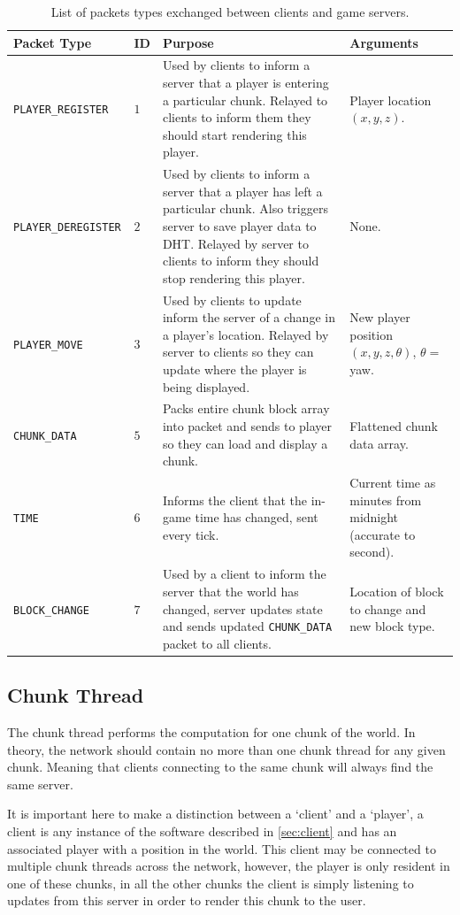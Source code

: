 \documentclass[10pt,twoside,notitlepage,a4paper]{report}
\begin{document}
	\begin{table}
		\begin{tabularx}{\textwidth}{| l | l | X | p{2cm} |}
			\hline
			\bf Packet Type & \bf ID & \bf Purpose & \bf Arguments \\
			\hline
			\tt PLAYER\_REGISTER & $1$ & Used by clients to inform a server that a player is entering a particular chunk. Relayed to clients to inform them they should start rendering this player. & Player location $(x,y,z)$. \\
			\hline
			\tt PLAYER\_DEREGISTER & $2$ & Used by clients to inform a server that a player has left a particular chunk. Also triggers server to save player data to DHT. Relayed by server to clients to inform they should stop rendering this player. & None. \\
			\hline
			\tt PLAYER\_MOVE & $3$ & Used by clients to update inform the server of a change in a player's location. Relayed by server to clients so they can update where the player is being displayed. & New player position $(x,y,z,\theta)$, $\theta=$ yaw. \\
			\hline
			\tt CHUNK\_DATA & $5$ & Packs entire chunk block array into packet and sends to player so they can load and display a chunk. & Flattened chunk data array. \\
			\hline
			\tt TIME & $6$ & Informs the client that the in-game time has changed, sent every tick. & Current time as minutes from midnight (accurate to second). \\
			\hline
			\tt BLOCK\_CHANGE & $7$ & Used by a client to inform the server that the world has changed, server updates state and sends updated \texttt{CHUNK\_DATA} packet to all clients. & Location of block to change and new block type. \\
			\hline
		\end{tabularx}
		\caption{List of packets types exchanged between clients and game servers.}
		\label{tab:gamepackets}
	\end{table}
	
	\subsection{Chunk Thread}
	\label{sec:cthread}
	The chunk thread performs the computation for one chunk of the world. In theory, the network should contain no more than one chunk thread for any given chunk. Meaning that clients connecting to the same chunk will always find the same server.
	
	It is important here to make a distinction between a `client' and a `player', a client is any instance of the software described in \cref{sec:client} and has an associated player with a position in the world. This client may be connected to multiple chunk threads across the network, however, the player is only resident in one of these chunks, in all the other chunks the client is simply listening to updates from this server in order to render this chunk to the user.
	
\end{document}
